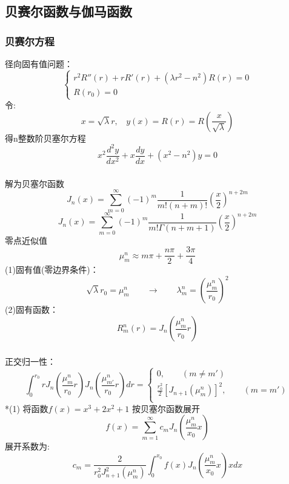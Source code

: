 \subsection{贝赛尔函数与伽马函数}

\begin{frame}
    \frametitle{贝赛尔方程}
    径向固有值问题：\vspace{0.6em}
    \[ \begin{cases}
    r^2 R'' (r)+r R'(r) +( \lambda r^2 -n^2)R(r)=0  \\
    R(r_0)=0
    \end{cases}\]	
    令:
	\begin{equation*}
		x=\sqrt{\lambda} r, ~~~~y(x)= R(r) =R(\frac{x}{\sqrt{\lambda}})
	\end{equation*}	
    得n整数阶贝塞尔方程
	\begin{equation*}
		\boxed{x^2\frac{d^2y}{dx^2} + x\frac{dy}{dx} +(x^2 -n^2)y=0}
	\end{equation*}
\end{frame}	

\begin{frame}
      \frametitle{}
      解为贝塞尔函数 	
      \begin{equation*}
		J_n(x) = \sum\limits_{m=0}^{\infty} (-1)^m  \frac{1}{m! (n+m) ! } (\frac{x}{2})^{n+2m} 
	\end{equation*}	
    \begin{equation*}
		J_n(x) = \sum\limits_{m=0}^{\infty} (-1)^m  \frac{1}{m! \Gamma(n+m+1) } (\frac{x}{2})^{n+2m} 
	\end{equation*}	
    零点近似值
    \begin{equation*}
		\mu_{m}^{n} \approx m \pi+\frac{n \pi}{2}+\frac{3 \pi}{4}
	\end{equation*}
    (1)固有值(零边界条件)：
	\[ \sqrt{\lambda}r_0 = \mu_{m}^{n}  \qquad \to \qquad \lambda_m ^n =(\frac{\mu_{m}^{n}}{r_0})^2 \]
	(2)固有函数：\[R_m ^n(r) = J_n (\frac{\mu_{m}^{n}}{r_0}r) \]
\end{frame}

\begin{frame}
      \frametitle{}
      正交归一性：
      \begin{equation*}
          \int_0 ^{r_0} r J_n (\frac{\mu_{m} ^{n}}{r_0}r) J_n (\frac{\mu_{m'} ^{n}}{r_0}r) dr =
          \begin{cases}
           0, \qquad (m \not =m') \\ 
           \frac{r_0^2}{2} [J_{n+1}(\mu_m ^n)]^2, \qquad (m =m') \\ 
          \end{cases} 
      \end{equation*}  
      *(1) 将函数$f(x)=x^3+2x^2 +1$ 按贝塞尔函数展开  
      \begin{equation*}
          f(x)=\sum_{m=1}^\infty c_m J_n(\frac{\mu_m ^n}{x_0} x)
      \end{equation*}	
      展开系数为: 
      \begin{equation*}
          c_m=\frac{2} {r^2_0 J_{n+1} ^2 (\mu_m ^n)} \int_0 ^{x_0} f(x) J_n(\frac{\mu_m ^n}{x_0} x) x dx 
      \end{equation*}	  
\end{frame}

